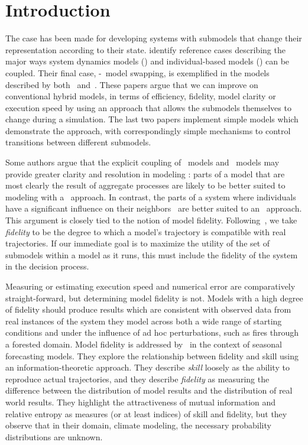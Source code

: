 \section{Introduction}
The case has been made for developing systems with sub\-models that
change their rep\-re\-sen\-ta\-tion according to their state.
 identify reference cases describing the
major ways system dynamics models (\SD) and in\-di\-vidu\-al-based models
(\IB) can be coupled. Their final case, \SD-\IB\ model swapping, is
exemplified in the models described by both~\cite{bobashev2007hybrid}
and~\cite{gray2012adaptive}. These papers argue that we can improve on
conventional hybrid models, in terms of efficiency, fidelity, model
clarity or execution speed by using an approach that allows the
sub\-models themselves to change during a simulation. The last two
papers implement simple models which demonstrate the approach, with
correspondingly simple mechanisms to control transitions between
different sub\-models. 

Some authors argue that the explicit coupling of \SD\ models and
\IB\ models may provide greater clarity and resolution in modeling
\citep{vincenot2011theoretical,fulton2010approaches}: parts of a model that are
most clearly the result of aggregate processes are likely to be better
suited to modeling with a \SD\ approach. In contrast, the
parts of a system where in\-di\-vidu\-als have a significant influence on
their neighbors~\citep{botkin1972some} are better suited to an
\IB\ approach. This argument is closely tied to the notion of model
fidelity. Following~\cite{delsole2010model}, we take
\emph{fidelity} to be the degree to which a model's trajectory is
compatible with real trajectories.  If our immediate goal is to
maximize the utility of the set of sub\-models within a model
as it runs, this must include the fidelity of the system in the
decision process.

Measuring or estimating execution speed and numerical error are
comparatively straight-forward, but determining model fidelity is not.
Models with a high degree of fidelity should produce results which are
consistent with observed data from real instances of the system they
model across both a wide range of starting conditions and under the
influence of ad hoc perturbations, such as fires through a forested
domain. Model fidelity is addressed by~\cite{delsole2010model} in the
context of seasonal forecasting models. They explore the relationship
between fidelity and skill using an information-theoretic approach.
They describe \emph{skill} loosely as the ability to reproduce actual
trajectories, and they describe \emph{fidelity} as measuring the
difference between the distribution of model results and the
distribution of real world results.  They highlight the attractiveness
of mutual information and relative entropy as measures (or at least
indices) of skill and fidelity, but they observe that in their domain,
climate modeling, the necessary probability distributions are unknown.


